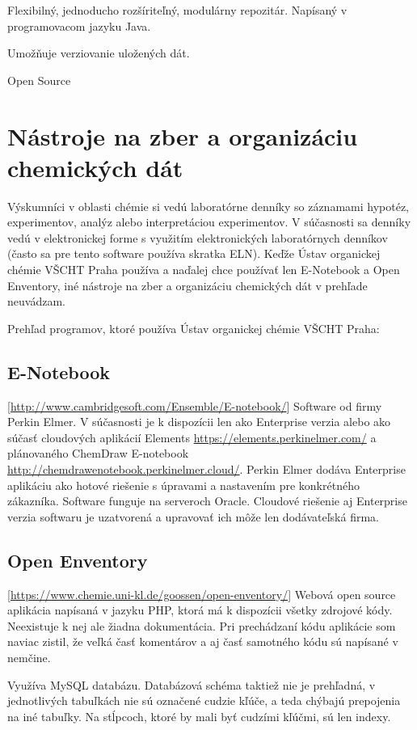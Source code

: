 \documentclass[thesis=M,slovak]{FITthesis}[2013/05/06]
\begin{document}
Flexibilný, jednoducho rozšíriteľný, modulárny repozitár. Napísaný v programovacom jazyku Java.

Umožňuje verziovanie uložených dát.

Open Source


\section{Nástroje na zber a organizáciu chemických dát}
Výskumníci v oblasti chémie si vedú laboratórne denníky so záznamami hypotéz, experimentov, analýz alebo interpretáciou experimentov. V súčasnosti sa denníky vedú v elektronickej forme s využitím elektronických laboratórnych denníkov (často sa pre tento software používa skratka ELN). Keďže Ústav organickej chémie VŠCHT Praha používa a naďalej chce používať len E-Notebook a Open Enventory, iné nástroje na zber a organizáciu chemických dát v prehľade neuvádzam.

Prehľad programov, ktoré používa Ústav organickej chémie VŠCHT Praha:
\subsection{E-Notebook} [\url{http://www.cambridgesoft.com/Ensemble/E-notebook/}]
Software od firmy Perkin Elmer. V súčasnosti je k dispozícii len ako Enterprise verzia alebo ako súčasť cloudových aplikácií Elements \url{https://elements.perkinelmer.com/} a plánovaného ChemDraw E-notebook \url{http://chemdrawenotebook.perkinelmer.cloud/}. Perkin Elmer dodáva Enterprise aplikáciu ako hotové riešenie s úpravami a nastavením pre konkrétného zákazníka. Software funguje na serveroch Oracle. Cloudové riešenie aj Enterprise verzia softwaru je uzatvorená a upravovať ich môže len dodávateľská firma.

\subsection{Open Enventory} [\url{https://www.chemie.uni-kl.de/goossen/open-enventory/}]
Webová open source aplikácia napísaná v jazyku PHP, ktorá má k dispozícii všetky zdrojové kódy. Neexistuje k nej ale žiadna dokumentácia. 
Pri prechádzaní kódu aplikácie som naviac zistil, že veľká časť komentárov a aj časť samotného kódu sú napísané v nemčine. 

Využíva MySQL databázu. Databázová schéma taktiež nie je prehľadná, v jednotlivých tabuľkách nie sú označené cudzie kľúče, a teda chýbajú prepojenia na iné tabuľky. Na stĺpcoch, ktoré by mali byť cudzími kľúčmi, sú len indexy.
\end{document}
